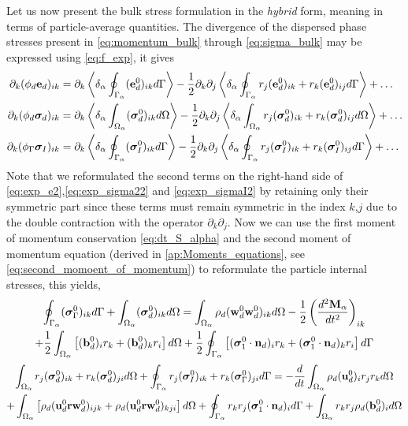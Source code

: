 Let us now present the bulk stress formulation in the \textit{hybrid} form, meaning in terms of particle-average quantities.  
The divergence of the dispersed phase stresses present in \ref{eq:momentum_bulk} through \ref{eq:sigma_bulk} may be expressed using \ref{eq:f_exp}, it gives
\begin{align}
    \label{eq:exp_e2}
    \partial_k (\phi_d \textbf{e}_d)_{ik} 
    &=  \partial_k\pSavg{ (\textbf e_d^0)_{ik} }
        -\frac{1}{2} \partial_k\partial_j \pSavg{ r_j (\textbf e_d^0)_{ik} +r_k (\textbf e_d^0)_{ij} }
        + \ldots  \\
    \label{eq:exp_sigma22}
    \partial_k (\phi_d \bm\sigma_d)_{ik}
    &=  \partial_k\pOavg{ (\bm\sigma_d^0)_{ik}}
    -\frac{1}{2} \partial_k\partial_j
    \pOavg{ r_j(\bm\sigma^0_d)_{ik} + r_k(\bm\sigma^0_d)_{ij}}
    + \ldots  \\
    \label{eq:exp_sigmaI2}
    \partial_k (\phi_\Gamma \bm\sigma_I)_{ik} 
    &=  \partial_k\pSavg{ (\bm\sigma_I^0)_{ik} }
        -\frac{1}{2} \partial_k\partial_j \pSavg{ r_j (\bm\sigma_I^0)_{ik} +r_k (\bm\sigma_I^0)_{ij} }
        + \ldots  
\end{align}
Note that we reformulated the second terms on the right-hand side of \ref{eq:exp_e2},\ref{eq:exp_sigma22} and \ref{eq:exp_sigmaI2} by retaining only their symmetric part since these terms must remain symmetric in the index $k$,$j$ due to the double contraction with the operator $\partial_k\partial_j$. 
Now we can use the first moment of momentum conservation \eqref{eq:dt_S_alpha} and the second moment of momentum equation (derived in \ref{ap:Moments_equations}, see \eqref{eq:second_momoent_of_momentum}) to reformulate the particle internal stresses, this yields,  
\begin{multline}
    \intS{ (\bm{\sigma}_\Gamma^0)_{ik}}
    +\intO{ (\bm{\sigma}_d^0)_{ik}}
    = 
    \intO{ \rho_d 
    (\textbf{w}_d^0\textbf{w}_d^0  )_{ik}
    }
    -\frac{1}{2}\left(\frac{d^2 \textbf{M}_\alpha}{dt^2} \right)_{ik}\\
    +\frac{1}{2}\intO{ \left[
        (\textbf{b}_d^0)_i
        r_k 
        + (\textbf{b}_d^0)_k
        r_i
    \right]}
    +
    \frac{1}{2}\intS{ \left[
        (\bm{\sigma}_1^0 \cdot \textbf{n}_d)_i r_k
        + (\bm{\sigma}_1^0 \cdot \textbf{n}_d)_k r_i
    \right]
    }
    \label{eq:dt_P1_alpha_bis}
\end{multline}
\begin{multline}
    \intO{ r_{j}(\bm{\sigma}^0_d)_{ik}+r_{k}(\bm{\sigma}^0_d)_{ji}}
    +\intS{ r_{j}(\bm{\sigma}^0_I)_{ik}+r_{k}(\bm{\sigma}_\Gamma^0)_{ji}}
    = 
    - \ddt\intO{ \rho_d (\textbf{u}_d^0)_i r_j r_k }
    \\
    + \intO{ \left[
        \rho_d (\textbf{u}^0_d\textbf{r}\textbf{w}_d^0)_{ijk} + \rho_d (\textbf{u}^0_d\textbf{r}\textbf{w}_d^0)_{kji}
    \right]}
    +\intS{  r_{k}r_{j} (\bm{\sigma}_1^0\cdot\textbf{n}_d)_i }
    + \intO{ r_{k}r_{j}  \rho_d (\textbf{b}_d^0)_i } 
    \label{eq:dt_P2_alpha_bis}
\end{multline}

